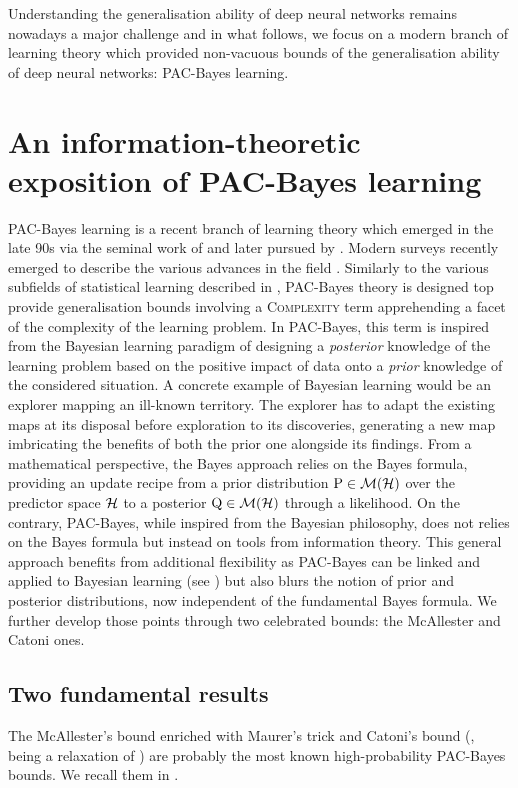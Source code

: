 Understanding the generalisation ability of deep neural networks remains nowadays a major challenge and in what follows, we focus on a modern branch of learning theory which provided non-vacuous bounds of the generalisation ability of deep neural networks: PAC-Bayes learning.

\section{An information-theoretic exposition of PAC-Bayes learning}

PAC-Bayes learning is a recent branch of learning theory which emerged in the late 90s via the seminal work of \citep{shawe1997pac,mcallester1998some,mcallester1999pac,mcallester2003pac} and later pursued by \citep{catoni2003pac,catoni2007pac}. Modern surveys recently emerged to describe the various advances in the field \citep{guedj2019primer,hellstrom2023generalization,alquier2024user}.  Similarly to the various subfields of statistical learning described in , PAC-Bayes theory is designed top provide generalisation bounds involving a \textsc{Complexity} term apprehending a facet of the complexity of the learning problem. In PAC-Bayes, this term is inspired from the Bayesian learning paradigm of designing a \emph{posterior} knowledge of the learning problem based on the positive impact of data onto a \emph{prior} knowledge of the considered situation. A concrete example of Bayesian learning would be an explorer mapping an ill-known territory. The explorer has to adapt the existing maps at its disposal before exploration to its discoveries, generating a new map imbricating the benefits of both the prior one alongside its findings. From a mathematical perspective, the Bayes approach relies on the Bayes formula, providing an update recipe from a prior distribution $\mathrm{P}\in\mathcal{M}(\mathcal{H})$ over the predictor space $\mathcal{H}$ to a posterior $\mathrm{Q}\in\mathcal{M}(\mathcal{H})$ through a likelihood. On the contrary, PAC-Bayes, while inspired from the Bayesian philosophy, does not relies on the Bayes formula but instead on tools from information theory. This general approach benefits from additional flexibility as PAC-Bayes can be linked and applied to Bayesian learning (see \citealp{guedj2019primer}) but also blurs the notion of prior and posterior distributions, now independent of the fundamental Bayes formula. We further develop those points through two celebrated bounds: the McAllester and Catoni ones. 

\subsection*{Two fundamental results}
    The McAllester's bound \citep{mcallester2003pac} enriched with Maurer's trick \citep{maurer2004note} and Catoni's bound (\citealp[Theorem 4.1]{alquier2016properties}, being a relaxation of \citealp[Theorem 1.2.6]{catoni2007pac}) are probably the most known high-probability PAC-Bayes bounds. We recall them in .

